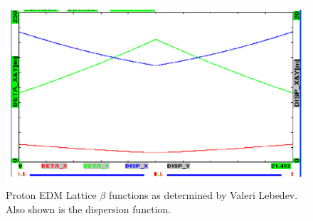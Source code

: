\documentclass[12]{article}
\begin{document}
\begin{figure}[h]
\centering
\includegraphics[scale=0.4]{ValLeb2-twiss.pdf}
\caption{\label{fig:ValLeb2Twiss}Proton EDM Lattice $\beta$ functions as determined by
Valeri Lebedev\cite{ValLeb2}. Also shown is the dispersion function.}
\end{figure}
\end{document}

